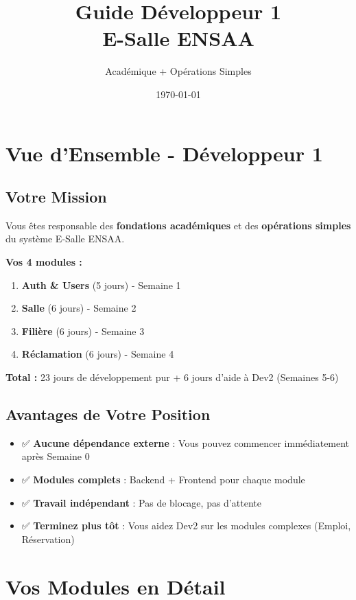 \documentclass[11pt,a4paper]{article}
\title{\textbf{Guide Développeur 1\\E-Salle ENSAA}}
\author{Académique + Opérations Simples}
\date{\today}
\begin{document}
\maketitle
\tableofcontents
\newpage

\section{Vue d'Ensemble - Développeur 1}

\subsection{Votre Mission}

Vous êtes responsable des \textbf{fondations académiques} et des \textbf{opérations simples} du système E-Salle ENSAA.

\textbf{Vos 4 modules :}
\begin{enumerate}
    \item \textbf{Auth \& Users} (5 jours) - Semaine 1
    \item \textbf{Salle} (6 jours) - Semaine 2
    \item \textbf{Filière} (6 jours) - Semaine 3
    \item \textbf{Réclamation} (6 jours) - Semaine 4
\end{enumerate}

\textbf{Total :} 23 jours de développement pur + 6 jours d'aide à Dev2 (Semaines 5-6)

\subsection{Avantages de Votre Position}

\begin{itemize}
    \item ✅ \textbf{Aucune dépendance externe} : Vous pouvez commencer immédiatement après Semaine 0
    \item ✅ \textbf{Modules complets} : Backend + Frontend pour chaque module
    \item ✅ \textbf{Travail indépendant} : Pas de blocage, pas d'attente
    \item ✅ \textbf{Terminez plus tôt} : Vous aidez Dev2 sur les modules complexes (Emploi, Réservation)
\end{itemize}

\newpage

\section{Vos Modules en Détail}
\end{document}
